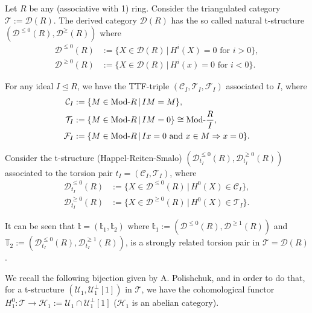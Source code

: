\begin{example}
  Let $R$ be any (associative with 1) ring. Consider the triangulated category $\mathcal{T}:=\mathcal{D}(R)$.
  The derived category $\mathcal{D}(R)$ has the so called natural t-structure
  $(\mathcal{D}^{\leq 0}(R),\mathcal{D}^{\geq}(R))$ where
  \begin{align*}
    \mathcal{D}^{\leq 0}(R) &:= \{ X\in\mathcal{D}(R) \,|\,H^i(X)=0\text{ for } i>0\},\\
    \mathcal{D}^{\geq 0}(R) &:= \{ X\in\mathcal{D}(R) \,|\,H^i(x)=0\text{ for } i<0\}.
  \end{align*}

  For any ideal $I\trianglelefteq R$, we have the TTF-triple $(\mathcal{C}_I,\mathcal{T}_I,\mathcal{F}_I)$
  associated to $I$, where
  \begin{align*}
    \mathcal{C}_I &:= \{M\in\mathrm{\textup{Mod-}}R\,|\,IM=M\},\\
    \mathcal{T}_I &:= \{M\in\mathrm{\textup{Mod-}}R\,|\,IM=0\}\cong \mathrm{\textup{Mod-}}\frac{R}{I},\\
    \mathcal{F}_I &:= \{M\in\mathrm{\textup{Mod-}}R\,|\,Ix=0\text{ and }x\in M\Rightarrow x=0\}.
  \end{align*}

  Consider the t-structure (Happel-Reiten-Smalo) $(\mathcal{D}^{\leq 0}_{t_I}(R), \mathcal{D}^{\geq 0}_{t_I}(R))$
  associated to the torsion pair $t_I=(\mathcal{C}_I,\mathcal{T}_I)$, where
  \begin{align*}
    \mathcal{D}^{\leq 0}_{t_I}(R) &:= \{ X\in\mathcal{D}^{\leq 0}(R)\,|\, H^0(X)\in\mathcal{C}_I \},\\
    \mathcal{D}^{\geq 0}_{t_I}(R) &:= \{ X\in\mathcal{D}^{\geq 0}(R)\,|\, H^0(X)\in\mathcal{T}_I \}.
  \end{align*}

  It can be seen that $\mathbb{t}=(\mathbb{t}_1,\mathbb{t}_2)$ where
  $\mathbb{t}_1:=(\mathcal{D}^{\leq 0}(R),\mathcal{D}^{\geq 1}(R))$ and
  $\mathbb{T}_2:=(\mathcal{D}^{\leq 0}_{t_I}(R),\mathcal{D}^{\geq 1}_{t_I}(R))$, is a strongly
  related torsion pair in $\mathcal{T}=\mathcal{D}(R)$.
\end{example}

We recall the following bijection given by A. Polishchuk, and in order to do that,
for a t-structure $(\mathcal{U}_1,\mathcal{U}_1^\perp[1])$ in $\mathcal{T}$, we have the cohomological
functor $H^0_1:\mathcal{T}\to \mathcal{H}_1:=\mathcal{U}_1\cap\mathcal{U}_1^\perp[1]$
($\mathcal{H}_1$ is an abelian category).

